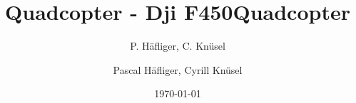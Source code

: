\title{Quadcopter - Dji F450}  
\author{P. Häfliger, C. Knüsel}
\title{Quadcopter}  
\author{Pascal Häfliger, Cyrill Knüsel}
\date{\today} 

\begin{frame}[plain]
\titlepage
\end{frame} 